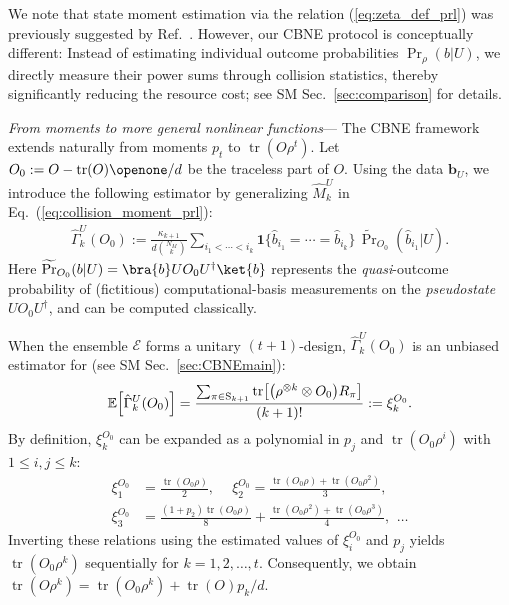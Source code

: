 \documentclass[aps,prl,twocolumn,nofootinbib,superscriptaddress,10pt]{revtex4-2}
\let\originalleft\left
\let\originalright\right
\renewcommand{\left}{\mathopen{}\mathclose\bgroup\originalleft}
\renewcommand{\right}{\aftergroup\egroup\originalright}
\def\E{ {\mathbb E} } %
\DeclareMathOperator{\Tr}{tr}
\theoremstyle{plain}
\theoremstyle{definition}
\def\eqref#1{\textup{(\ref{#1})}}
\newcommand{\eref}[1]{Eq.~\textup{(\ref{#1})}}
\begin{document}
We note that state moment estimation via the relation \eqref{eq:zeta_def_prl} was previously suggested by  Ref.~\cite{PhysRevLett.108.110503}.
However, our CBNE protocol is conceptually different:
Instead of estimating individual outcome probabilities $\Pr_{\rho}(b|U)$, 
we directly measure their power sums through collision statistics, thereby significantly reducing the resource cost; see SM Sec.~\ref{sec:comparison} for details.


\emph{From moments to more general nonlinear functions}---
The CBNE framework extends naturally from moments $p_t$ to $\Tr(O\rho^t)$. 
Let $O_0:=O-\Tr(O)\openone/d$ be the traceless part of $O$. 
Using the data $\mathbf{b}_U$, we introduce the following estimator by generalizing $\hat M_k^U$ in \eref{eq:collision_moment_prl}:  
\begin{align}\label{eq:collision_general_prl}
\hat{\Gamma}_k^U(O_0)
:=
\frac{\kappa_{k+1}}{d\binom{N_M}{k}}
\sum_{i_1<\cdots<i_k}\!
\mathbf{1}\{\hat{b}_{i_1}\!=\cdots=\hat{b}_{i_k}\}
\,\widetilde{\Pr}_{O_0}(\hat{b}_{i_1}|U).
\end{align}
Here $\widetilde{\Pr}_{O_0}(b|U)=\bra{b} U O_0 U^{\dag} \ket{b}$ represents the \emph{quasi}-outcome probability of (fictitious) computational-basis measurements on the \emph{pseudostate} $U O_0 U^{\dag}$, and can be computed classically.



When the ensemble $\mathcal E$ forms a unitary $(t+1)$-design,
$\hat{\Gamma}_k^{U} (O_0)$ is an unbiased estimator for (see SM Sec.~\ref{sec:CBNEmain}): 
\begin{align}\label{eq:xikO0def}
\E \left[ \hat{\Gamma}_k^U (O_0)\right] 
= \frac{\sum_{\pi\in \mathrm{S}_{k+1}}  \Tr\left[ \left(\rho^{\otimes k} \otimes O_0 \right)R_\pi\right] }{(k+1)! } 
:=\xi_k^{O_0}. 
\end{align}
By definition, $\xi_k^{O_0}$ can be expanded as a polynomial in 
$p_j$ and $\Tr(O_0\rho^i)$ with $1\leq i,j\leq k$:  
\begin{align}\label{eq:xiORelation}
\!\xi_1^{O_0}&=  \frac{\Tr(O_0\rho)}{2}, 
\quad \ 
\xi_2^{O_0}=  \frac{\Tr(O_0\rho)+\Tr(O_0\rho^2)}{3},
\nonumber\\ 
\!\xi_3^{O_0}&=  \frac{(1+p_2)\Tr(O_0\rho)}{8} + \frac{\Tr(O_0\rho^2)+\Tr(O_0\rho^3)}{4}, \ \, \dots
\end{align}
Inverting these relations using the estimated values of $\xi_i^{O_0}$ and $p_j$ yields $\Tr(O_0\rho^k)$ sequentially for $k=1,2,\dots,t$. 
Consequently, we obtain $\Tr(O\rho^k)= \Tr(O_0\rho^k)+ \Tr(O)p_k/d$. 
\end{document}
